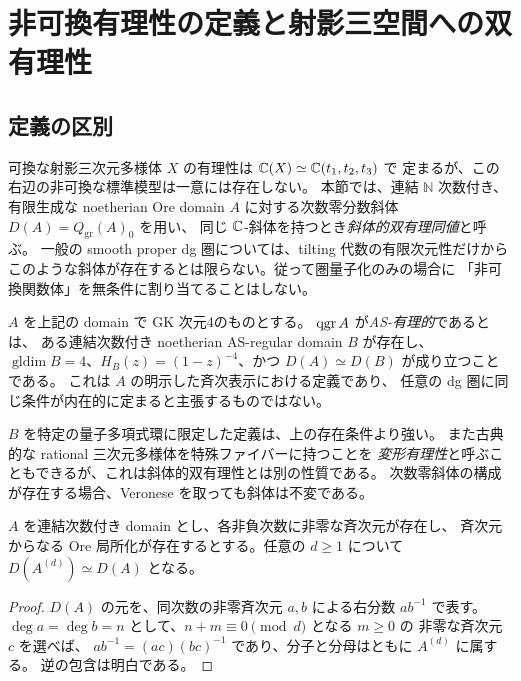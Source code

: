 \section{非可換有理性の定義と射影三空間への双有理性}\label{sec:nc-rationality}
\subsection{定義の区別}
可換な射影三次元多様体 $X$ の有理性は $\mathbb C(X)\simeq\mathbb C(t_1,t_2,t_3)$ で
定まるが、この右辺の非可換な標準模型は一意には存在しない。
本節では、連結 $\mathbb N$ 次数付き、有限生成な noetherian Ore domain $A$
に対する次数零分数斜体 $D(A)=Q_{\mathrm{gr}}(A)_0$ を用い、
同じ $\mathbb C$-斜体を持つとき\emph{斜体的双有理同値}と呼ぶ。
一般の smooth proper dg 圏については、tilting 代数の有限次元性だけから
このような斜体が存在するとは限らない。従って圏量子化のみの場合に
「非可換関数体」を無条件に割り当てることはしない。

\begin{definition}\label{def:as-rational}
$A$ を上記の domain で GK 次元4のものとする。
$\operatorname{qgr} A$ が\emph{AS-有理的}であるとは、
ある連結次数付き noetherian AS-regular domain $B$ が存在し、
$\operatorname{gldim}B=4$、$H_B(z)=(1-z)^{-4}$、かつ
$D(A)\simeq D(B)$ が成り立つことである。
これは $A$ の明示した斉次表示における定義であり、
任意の dg 圏に同じ条件が内在的に定まると主張するものではない。
\end{definition}

$B$ を特定の量子多項式環に限定した定義は、上の存在条件より強い。
また古典的な rational 三次元多様体を特殊ファイバーに持つことを
\emph{変形有理性}と呼ぶこともできるが、これは斜体的双有理性とは別の性質である。
次数零斜体の構成が存在する場合、Veronese を取っても斜体は不変である。

\begin{lemma}\label{lem:veronese-function}
$A$ を連結次数付き domain とし、各非負次数に非零な斉次元が存在し、
斉次元からなる Ore 局所化が存在するとする。任意の $d\ge1$ について
$D(A^{(d)})\simeq D(A)$ となる。
\end{lemma}
\begin{proof}
$D(A)$ の元を、同次数の非零斉次元 $a,b$ による右分数 $ab^{-1}$ で表す。
$\deg a=\deg b=n$ として、$n+m\equiv0\pmod d$ となる $m\ge0$ の
非零な斉次元 $c$ を選べば、
$ab^{-1}=(ac)(bc)^{-1}$ であり、分子と分母はともに $A^{(d)}$ に属する。
逆の包含は明白である。
\end{proof}

